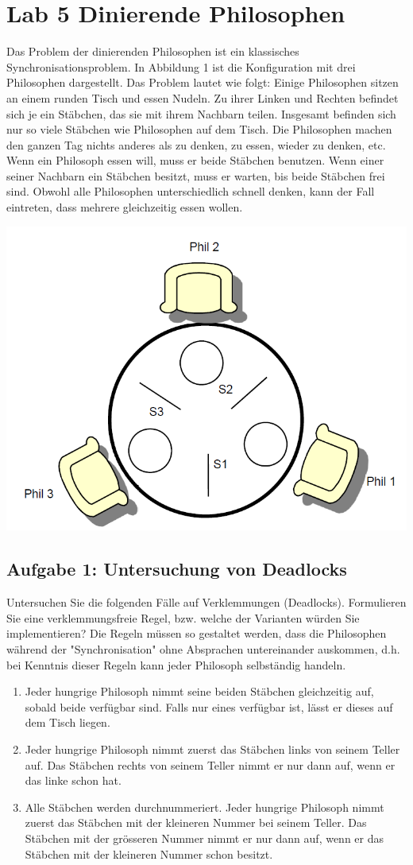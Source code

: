 \section{Lab 5 Dinierende Philosophen}
Das Problem der dinierenden Philosophen ist ein klassisches Synchronisationsproblem. In Abbildung 1 ist die Konfiguration mit drei Philosophen dargestellt. Das Problem lautet wie folgt: Einige Philosophen sitzen an einem runden Tisch und essen Nudeln. Zu ihrer Linken und Rechten befindet sich je ein Stäbchen, das sie mit ihrem Nachbarn teilen. Insgesamt befinden sich nur so viele Stäbchen wie Philosophen auf dem Tisch. Die Philosophen machen den ganzen Tag nichts anderes als zu denken, zu essen, wieder zu denken, etc. Wenn ein Philosoph essen will, muss er beide Stäbchen benutzen. Wenn einer seiner Nachbarn ein Stäbchen besitzt, muss er warten, bis beide Stäbchen frei sind. Obwohl alle Philosophen unterschiedlich schnell denken, kann der Fall eintreten, dass mehrere gleichzeitig essen wollen.

\includegraphics[width=.4\linewidth]{900-Praktika/prak05/pic.PNG}


\subsection{Aufgabe 1: Untersuchung von Deadlocks}
Untersuchen Sie die folgenden Fälle auf Verklemmungen (Deadlocks). Formulieren Sie eine verklemmungsfreie
Regel, bzw. welche der Varianten würden Sie implementieren? Die Regeln müssen so gestaltet werden,
dass die Philosophen während der "Synchronisation" ohne Absprachen untereinander auskommen, d.h.
bei Kenntnis dieser Regeln kann jeder Philosoph selbständig handeln.

\begin{enumerate}
  \item Jeder hungrige Philosoph nimmt seine beiden Stäbchen gleichzeitig auf, sobald beide verfügbar sind. Falls nur eines verfügbar ist, lässt er dieses auf dem Tisch liegen.
  \item Jeder hungrige Philosoph nimmt zuerst das Stäbchen links von seinem Teller auf. Das Stäbchen rechts von seinem Teller nimmt er nur dann auf, wenn er das linke schon hat.
  \item Alle Stäbchen werden durchnummeriert. Jeder hungrige Philosoph nimmt zuerst das Stäbchen mit der kleineren Nummer bei seinem Teller. Das Stäbchen mit der grösseren Nummer nimmt er nur dann auf, wenn er das Stäbchen mit der kleineren Nummer schon besitzt.
\end{enumerate}

